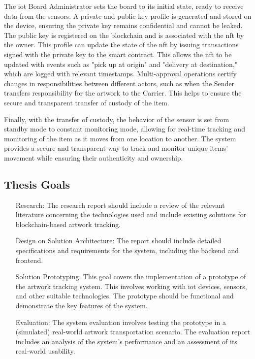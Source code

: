 The \gls{iot} Board Administrator sets the board to its initial state, ready to receive data from the sensors. A private and public key profile is generated and stored on the device, ensuring the private key remains confidential and cannot be leaked. The public key is registered on the blockchain and is associated with the \gls{nft} by the owner. This profile can update the state of the \gls{nft} by issuing transactions signed with the private key to the smart contract. This allows the \gls{nft} to be updated with events such as "pick up at origin" and "delivery at destination," which are logged with relevant timestamps. 
Multi-approval operations certify changes in responsibilities between different actors, such as when the Sender transfers responsibility for the artwork to the Carrier. This helps to ensure the secure and transparent transfer of custody of the item. 

Finally, with the transfer of custody, the behavior of the sensor is set from standby mode to constant monitoring mode, allowing for real-time tracking and monitoring of the item as it moves from one location to another. The system provides a secure and transparent way to track and monitor unique items' movement while ensuring their authenticity and ownership.

\subsection{Thesis Goals}
\label{sec:thesis_goals}
\begin{itemize}[font=\textbf, align=left]
    \item[Research:] The research report should include a review of the relevant literature concerning the technologies used and include existing solutions for blockchain-based artwork tracking.
    \item[Design on Solution Architecture:] The report should include detailed specifications and requirements for the system, including the backend and frontend.
    \item[Solution Prototyping:] This goal covers the implementation of a prototype of the artwork tracking system. This involves working with \gls{iot} devices, sensors, and other suitable technologies. The prototype should be functional and demonstrate the key features of the system.
    \item[Evaluation:] The system evaluation involves testing the prototype in a (simulated) real-world artwork transportation scenario. The evaluation report includes an analysis of the system's performance and an assessment of its real-world usability.
\end{itemize}

